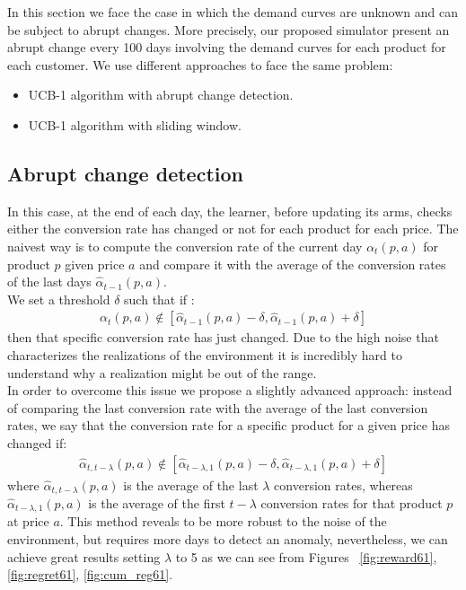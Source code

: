 In this section we face the case in which the demand curves are unknown and can be subject to abrupt changes. More precisely, our proposed simulator present an abrupt change every 100 days involving the demand curves for each product for each customer.
We use different approaches to face the same problem:
\begin{itemize}
    \item UCB-1 algorithm with abrupt change detection.
    \item UCB-1 algorithm with sliding window.
\end{itemize}
\subsection{Abrupt change detection}
\label{learner2}
In this case, at the end of each day, the learner, before updating its arms, checks either the conversion rate has changed or not for each product for each price. The naivest way is to compute the conversion rate of the current day $\alpha_t(p, a)$ for product $p$ given price $a$ and compare it with the average of the conversion rates of the last days $\hat{\alpha}_{t-1}(p, a)$.\\ We set a threshold $\delta$ such that if :
\begin{align*}
        \alpha_t(p, a) \not\in \left[ \hat{\alpha}_{t-1}(p, a) - \delta, \hat{\alpha}_{t-1}(p, a) + \delta \right]
\end{align*}
then that specific conversion rate has just changed. Due to the high noise that characterizes the realizations of the environment it is incredibly hard to understand why a realization might be out of the range.
\\In order to overcome this issue we propose a slightly advanced approach: instead of comparing the last conversion rate with the average of the last conversion rates, we say that the conversion rate for a specific product for a given price has changed if:
\begin{align*}
    \hat{\alpha}_{t, t -\lambda}(p, a) \not\in \left[ \hat{\alpha}_{t-\lambda, 1}(p, a) - \delta, \hat{\alpha}_{t-\lambda, 1}(p, a) + \delta \right]
\end{align*}
where $\hat{\alpha}_{t, t -\lambda}(p, a)$ is the average of the last $\lambda$ conversion rates, whereas $ \hat{\alpha}_{t-\lambda, 1}(p, a)$ is the average of the first $t - \lambda$ conversion rates for that product $p$ at price $a$. This method reveals to be more robust to the noise of the environment, but requires more days to detect an anomaly, nevertheless, we can achieve great results setting $\lambda$ to 5 as we can see from Figures ~\ref{fig:reward61}, \ref{fig:regret61}, \ref{fig:cum_reg61}.\\
